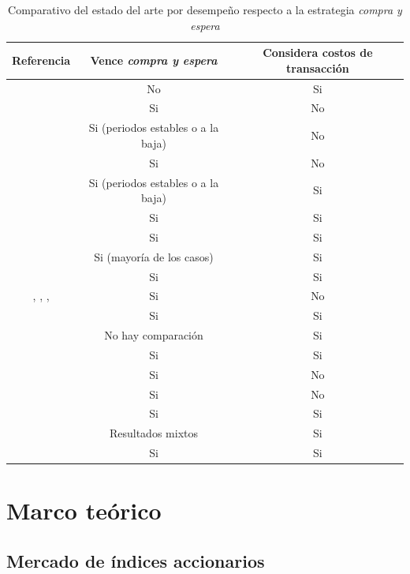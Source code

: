 \documentclass[12pt]{report}
\theoremstyle{break}
\theoremstyle{break}
\begin{document}
\begin{center}
\begin{table}[htbp]
\centering
\begin{tabular}{ccc}
\hline
\textbf{Referencia} & \textbf{Vence \textit{compra y espera}} & \textbf{Considera costos de transacción} \\
\hline
\cite{Allen1999} & No & Si \\
\cite{Leigh2002} & Si & No\\
\cite{Potvin2004} & Si (periodos estables o a la baja)  & No\\
\cite{Parracho2010} & Si & No\\
\cite{Kaucic2010} & Si (periodos estables o a la baja) & Si\\
\cite{Lohpetch2010} & Si & Si\\
\cite{Teixeira2010} & Si & Si\\
\cite{Preen2010} & Si (mayoría de los casos) & Si\\
\cite{Esfahanipour2011} & Si & Si\\
\cite{Canelas2012-gecco}, \cite{Canelas2013-gecco}, \cite{Canelas2013-journal}, \cite{Leitao2016} & Si & No \\
\cite{Kuo2013} & Si & Si \\
\cite{Wang2014} & No hay comparación & Si \\
\cite{Hu2015-XCS} & Si & Si \\
\cite{Huang2015} & Si & No \\
\cite{Kim2016} & Si & No \\
\cite{Kampouridis2017} & Si & Si\\
\cite{Sezer2017} & Resultados mixtos & Si\\
\cite{Alimoradi2018} & Si & Si\\
\hline
\end{tabular}
\caption{\label{tabla:referencia-venceBH} Comparativo del estado del arte por desempeño respecto a la estrategia \textit{compra y espera}}
\end{table}
\end{center}


\chapter[Capítulo \thechapter: Marco teórico]{Marco teórico}
\label{capitulo:marco teorico}

\section{Mercado de índices accionarios}
\label{seccion:indices accionarios}
\end{document}
